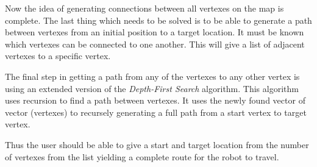 \documentclass[../Head/Main.tex]{subfiles}
\begin{document}



Now the idea of generating connections between all vertexes on the map is complete. The last thing which needs to be solved is to be able to generate a path between vertexes from an initial position to a target location. It must be known which vertexes can be connected to one another. This will give a list of adjacent vertexes to a specific vertex. 

The final step in getting a path from any of the vertexes to any other vertex is using an extended version of the \textit{Depth-First Search} algorithm. This algorithm uses recursion to find a path between vertexes. It uses the newly found vector of vector (vertexes) to recursely generating a full path from a start vertex to target vertex. 

Thus the user should be able to give a start and target location from the number of vertexes from the list yielding a complete route for the robot to travel.
\end{document}
